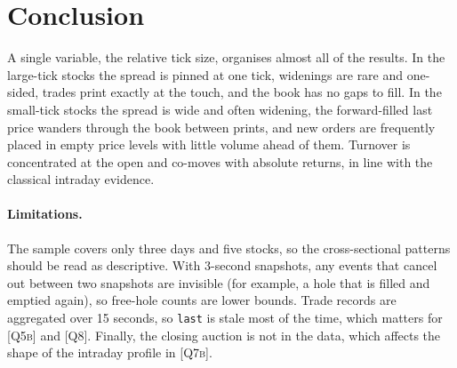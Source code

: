 \documentclass[11pt,a4paper]{article}
\newcommand{\Q}[1]{\textsc{[Q#1]}}
\newcommand{\code}[1]{\texttt{#1}}
\begin{document}
\section{Conclusion}\label{sec:conclusion}

A single variable, the relative tick size, organises almost all of the results. In the large-tick
stocks the spread is pinned at one tick, widenings are rare and one-sided, trades print exactly at
the touch, and the book has no gaps to fill. In the small-tick stocks the spread is wide and often
widening, the forward-filled last price wanders through the book between prints, and new orders
are frequently placed in empty price levels with little volume ahead of them. Turnover is
concentrated at the open and co-moves with absolute returns, in line with the classical intraday
evidence.

\paragraph{Limitations.} The sample covers only three days and five stocks, so the
cross-sectional patterns should be read as descriptive. With 3-second snapshots, any events that
cancel out between two snapshots are invisible (for example, a hole that is filled and emptied
again), so free-hole counts are lower bounds. Trade records are aggregated over 15 seconds, so
\code{last} is stale most of the time, which matters for \Q{5b} and \Q{8}. Finally, the closing
auction is not in the data, which affects the shape of the intraday profile in \Q{7b}.
\end{document}
